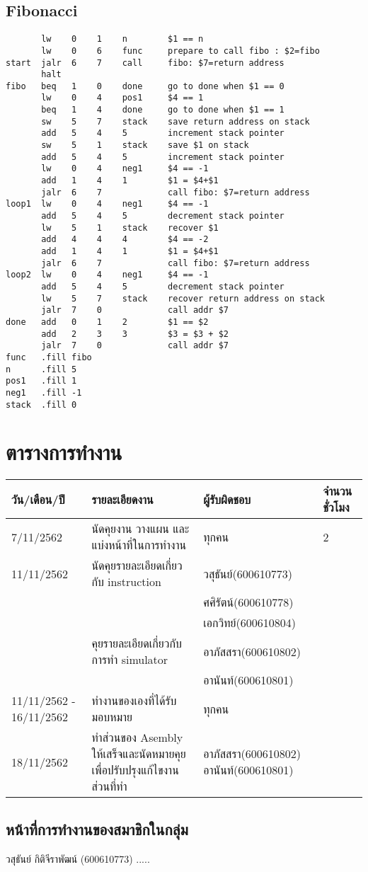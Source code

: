 \documentclass{article}
\begin{document}
\subsection{Fibonacci}
\begin{lstlisting}
       lw    0    1    n        $1 == n     
       lw    0    6    func     prepare to call fibo : $2=fibo 
start  jalr  6    7    call     fibo: $7=return address
       halt
fibo   beq   1    0    done     go to done when $1 == 0
       lw    0    4    pos1     $4 == 1
       beq   1    4    done     go to done when $1 == 1
       sw    5    7    stack    save return address on stack
       add   5    4    5        increment stack pointer
       sw    5    1    stack    save $1 on stack
       add   5    4    5        increment stack pointer
       lw    0    4    neg1     $4 == -1
       add   1    4    1        $1 = $4+$1
       jalr  6    7             call fibo: $7=return address
loop1  lw    0    4    neg1     $4 == -1
       add   5    4    5        decrement stack pointer
       lw    5    1    stack    recover $1
       add   4    4    4        $4 == -2
       add   1    4    1        $1 = $4+$1
       jalr  6    7             call fibo: $7=return address
loop2  lw    0    4    neg1     $4 == -1
       add   5    4    5        decrement stack pointer
       lw    5    7    stack    recover return address on stack
       jalr  7    0             call addr $7
done   add   0    1    2        $1 == $2
       add   2    3    3        $3 = $3 + $2
       jalr  7    0             call addr $7
func   .fill fibo
n      .fill 5
pos1   .fill 1
neg1   .fill -1
stack  .fill 0   
\end{lstlisting}

\newpage
\section{ตารางการทำงาน}

\begin{tabular}{ |p{2cm}|p{6cm}|p{3cm}|p{2cm}|  }
\hline
วัน/เดือน/ปี & รายละเอียดงาน &ผู้รับผิดชอบ & จำนวนชั่วโมง\\
\hline
7/11/2562 & นัดคุยงาน วางแผน และแบ่งหน้าที่ในการทำงาน  & ทุกคน & 2 \\
\hline
11/11/2562 & นัดคุยรายละเอียดเกี่ยวกับ instruction  & วสุธันย์(600610773) \\ &&ศศิรัตน์(600610778) \\ &&เอกวิทย์(600610804) \\
          & คุยรายละเอียดเกี่ยวกับการทำ simulator & อาภัสสรา(600610802)  \\ && อานันท์(600610801) \\
\hline
11/11/2562 - 16/11/2562 &ทำงานของเองที่ได้รับมอบหมาย & ทุกคน\\
\hline
18/11/2562 &ทำส่วนของ Asembly ให้เสร็จและนัดหมายคุยเพื่อปรับปรุงแก้ไขงานส่วนที่ทำ & อาภัสสรา(600610802)        อานันท์(600610801)\\
\hline
\end{tabular}
\subsection{หน้าที่การทำงานของสมาชิกในกลุ่ม}
วสุธันย์ กิติจีราพัฒน์ (600610773) ..... 
\end{document}
